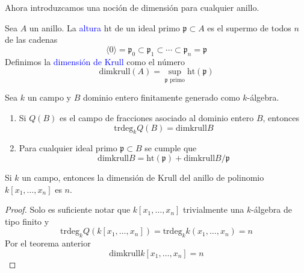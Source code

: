     Ahora introduzcamos una noción de dimensión para cualquier anillo.
\begin{definition}
    Sea $A$ un anillo. La \textcolor{blue}{altura} $\mathrm{ht}$ de un ideal primo $\mathfrak{p}\subset A$ es el supermo de todos $n$ de las cadenas
    \begin{equation*}
        \langle 0 \rangle= \mathfrak{p}_0\subset \mathfrak{p}_1\subset \cdots \subset \mathfrak{p}_n= \mathfrak{p}
    \end{equation*}
    Definimos la \textcolor{blue}{dimensión de Krull} como el número
    \begin{equation*}
        \mathrm{dimkrull}(A)=\sup_{\mathfrak{p}\text{ primo}}\mathrm{ht}(\mathfrak{p})
    \end{equation*}
\end{definition}

    \begin{theorem}\label{krulltrdeg}
        Sea $k$ un campo y $B$ dominio entero finitamente generado como $k$-álgebra.
        \begin{enumerate}
            \item Si $Q(B)$ es el campo de fracciones asociado al dominio entero $B$, entonces
            \begin{equation*}
                \mathrm{trdeg}_kQ(B)=\mathrm{dimkrull} B
            \end{equation*}
            \item Para cualquier ideal primo $\mathfrak{p}\subset B$ se cumple que
            \begin{equation*}
                \mathrm{dimkrull} B = \mathrm{ht}(\mathfrak{p}) + \mathrm{dimkrull} B/\mathfrak{p}
            \end{equation*}
        \end{enumerate}
    \end{theorem}

    \begin{corollary}
        Si $k$ un campo, entonces la dimensión de Krull del anillo de polinomio $k[x_1,\dots, x_n]$ es $n$.
    \end{corollary}
    \begin{proof}
        Solo es suficiente notar que $k[x_1,\dots, x_n]$ trivialmente una $k$-álgebra de tipo finito y
        \begin{equation*}
            \mathrm{trdeg}_kQ(k[x_1,\dots, x_n])=\mathrm{trdeg}_k k(x_1,\dots, x_n)=n
        \end{equation*}
        Por el teorema anterior
        \begin{equation*}
            \mathrm{dimkrull}k[x_1,\dots, x_n]=n
        \end{equation*}
    \end{proof}

